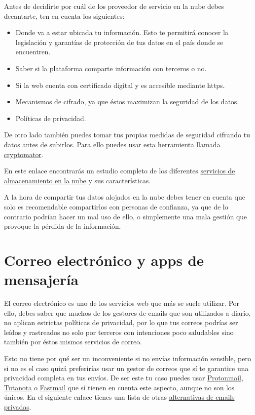 \documentclass[
  spanish,
  a4paper,
  openany]{book}
\begin{document}
Antes de decidirte por cuál de los proveedor de servicio en la nube debes decantarte, ten en cuenta los siguientes:

\begin{itemize}
\item
  Donde va a estar ubicada tu información. Esto te permitirá conocer la legislación y
  garantías de protección de tus datos en el país donde se encuentren.
\item
  Saber si la plataforma comparte información con terceros o no.
\item
  Si la web cuenta con certificado digital y es accesible mediante https.
\item
  Mecanismos de cifrado, ya que éstos maximizan la seguridad de los datos.
\item
  Políticas de privacidad.
\end{itemize}

De otro lado también puedes tomar tus propias medidas de seguridad cifrando tu datos antes de subirlos. Para ello puedes usar esta herramienta llamada \href{https://cryptomator.org/}{cryptomator}.

En este enlace encontrarás un estudio completo de los diferentes \href{https://www.osi.es/sites/default/files/docs/osi_servicios_nube.pdf}{servicios de almacenamiento en la nube} y sus características.

A la hora de compartir tus datos alojados en la nube debes tener en cuenta que solo es recomendable compartirlos con personas de confianza, ya que de lo contrario podrían hacer un mal uso de ello, o simplemente una mala gestión que provoque la pérdida de la información.

\hypertarget{correo-electruxf3nico-y-apps-de-mensajeruxeda}{%
\section{Correo electrónico y apps de mensajería}\label{correo-electruxf3nico-y-apps-de-mensajeruxeda}}

El correo electrónico es uno de los servicios web que más se suele utilizar. Por ello, debes saber que muchos de los gestores de emails que son utilizados a diario, no aplican estrictas políticas de privacidad, por lo que tus correos podrías ser leídos y rastreados no solo por terceros con intenciones poco saludables sino también por éstos mismos servicios de correo.

Esto no tiene por qué ser un inconveniente si no envías información sensible, pero si no es el caso quizá preferirías usar un gestor de correos que sí te garantice una privacidad completa en tus envíos. De ser este tu caso puedes usar \href{https://protonmail.com/}{Protonmail}, \href{https://tutanota.com/es/}{Tutanota} o \href{https://www.fastmail.com}{Fastmail} que sí tienen en cuenta este aspecto, aunque no son los únicos. En el siguiente enlace tienes una lista de otras \href{https://blogthinkbig.com/alternativas-gratuitas-gmail-outlook-privacidad}{alternativas de emails privadas}.
\end{document}
